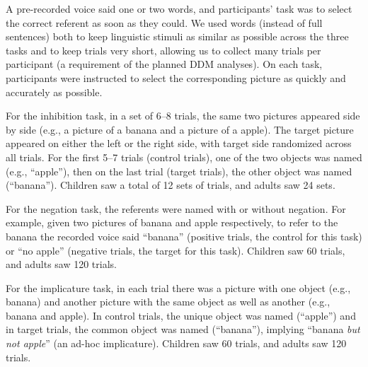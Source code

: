 \documentclass[10pt,letterpaper]{article}
\begin{document}
A pre-recorded voice said one or two words, and participants' task was to select the correct referent as soon as they could. We used words (instead of full sentences) both to keep linguistic stimuli as similar as possible across the three tasks and to keep trials very short, allowing us to collect many trials per participant (a requirement of the planned DDM analyses). On each task, participants were instructed to select the corresponding picture as quickly and accurately as possible.  

For the inhibition task, in a set of 6--8 trials, the same two pictures appeared side by side (e.g., a picture of a banana and a picture of a apple). The target picture appeared on either the left or the right side, with target side randomized across all trials. For the first 5--7 trials (control trials), one of the two objects was named (e.g., ``apple''), then on the last trial (target trials), the other object was named (``banana'').
Children saw a total of 12 sets of trials, and adults saw 24 sets.

For the negation task, the referents were named with or without negation. For example, given two pictures of banana and apple respectively, to refer to the banana the recorded voice said ``banana'' (positive trials, the control for this task) or ``no apple'' (negative trials, the target for this task). Children saw 60 trials, and adults saw 120 trials.

For the implicature task, in each trial there was a picture with one object (e.g., banana) and another picture with the same object as well as another (e.g., banana and apple). In control trials, the unique object was named (``apple'') and in target trials, the common object was named (``banana''), implying ``banana \emph{but not apple}'' (an ad-hoc implicature). Children saw 60 trials, and adults saw 120 trials.
\end{document}
